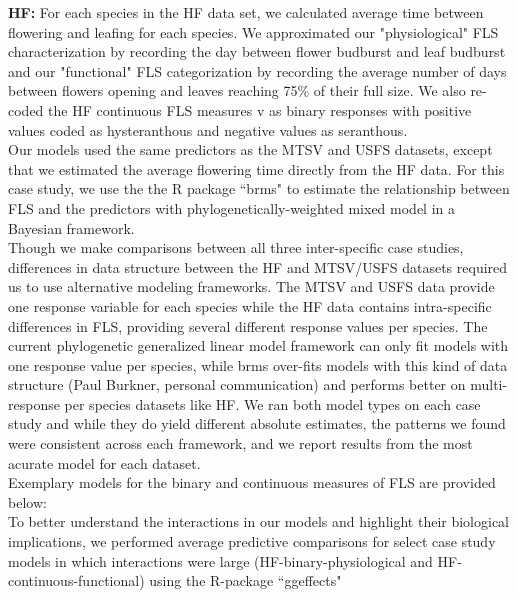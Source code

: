 \documentclass[12pt]{article}\usepackage[]{graphicx}\usepackage[]{color}
\begin{document}
\indent \textbf{HF:} For each species in the HF data set, we calculated average time between flowering and leafing for each species. We approximated our "physiological" FLS characterization by recording the day between flower budburst and leaf budburst and our "functional" FLS categorization by recording the average number of days between flowers opening and leaves reaching 75\% of their full size. We also re-coded the HF continuous FLS measures v as binary responses with positive values coded as hysteranthous and negative values as seranthous.\\ Our models used the same predictors as the MTSV and USFS datasets, except that we estimated the average flowering time directly from the HF data. For this case study, we use the the R package ``brms" \citep{Burkner2018} to estimate the relationship between FLS and the predictors with  phylogenetically-weighted mixed model in a Bayesian framework.\\ 
\indent Though we make comparisons between all three inter-specific case studies, differences in data structure between the HF  and MTSV/USFS datasets required us to use alternative modeling frameworks. The MTSV and USFS data provide one response variable for each species while the HF data contains intra-specific differences in FLS, providing several different response values per species. The current phylogenetic generalized linear model framework can only fit models with one response value per species, while brms over-fits models with this kind of data structure (Paul Burkner, personal communication) and performs better on multi-response per species datasets like HF. We ran both model types on each case study and while they do yield different absolute estimates, the patterns we found were consistent across each framework, and we report results from the most acurate model for each dataset.\\
\indent Exemplary models for the binary and continuous measures of FLS are provided below:\\

\indent To better understand the interactions in our models and highlight their biological implications, we performed average predictive comparisons for select case study models in which interactions were large (HF-binary-physiological and HF-continuous-functional) using the R-package ``ggeffects" \citep{Ludecke2018}
\end{document}
